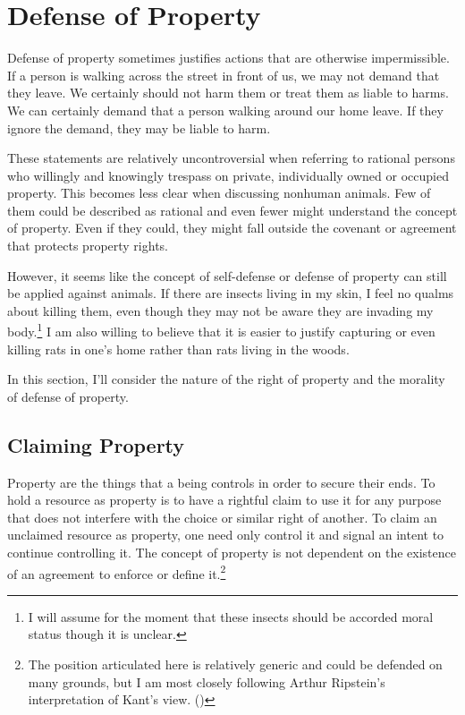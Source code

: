 \section{Defense of Property}

	Defense of property sometimes justifies actions that are otherwise
	impermissible. If a person is walking across the street in front of us, we
	may not demand that they leave. We certainly should not harm them or treat
	them as liable to harms.  We can certainly demand that a person walking
	around our home leave. If they ignore the demand, they may be liable to
	harm.

	These statements are relatively uncontroversial when referring to rational
	persons who willingly and knowingly trespass on private, individually owned
	or occupied property. This becomes less clear when discussing nonhuman
	animals. Few of them could be described as rational and even fewer might
	understand the concept of property. Even if they could, they might fall
	outside the covenant or agreement that protects property rights.

	However, it seems like the concept of self-defense or defense of
	property can still be applied against animals.  If there are insects living
	in my skin, I feel no qualms about killing them, even though they may not
	be aware they are invading my body.\footnote{I will assume for the moment
	that these insects should be accorded moral status though it is unclear.}
	I am also willing to believe that it is easier to justify capturing or even
	killing rats in one’s home rather than rats living in the woods.

	In this section, I’ll consider the nature of the right of property and the
	morality of defense of property. 

	\subsection{Claiming Property}

	Property are the things that a being controls in order to secure their
	ends.  To hold a resource as property is to have a rightful claim to use it
	for any purpose that does not interfere with the choice or similar right of
	another.  To claim an unclaimed resource as property, one need only control
	it and signal an intent to continue controlling it.  The concept of
	property is not dependent on the existence of an agreement to enforce or
	define it.\footnote{The position articulated here is relatively generic and
	could be defended on many grounds, but I am most closely following Arthur
Ripstein’s interpretation of Kant’s view. (\cite{ripstein_force_freedom})}

